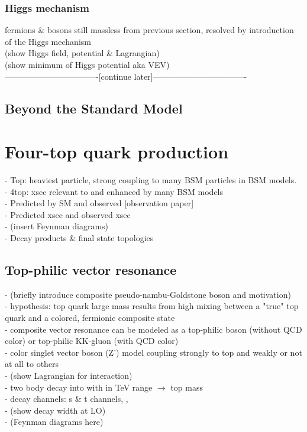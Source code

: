 \documentclass[../thesis.tex]{subfiles}
\begin{document}
\subsubsection*{Higgs mechanism}
fermions \& bosons still massless from previous section, resolved by introduction of the Higgs mechanism\\
(show Higgs field, potential \& Lagrangian)\\
(show minimum of Higgs potential aka VEV)\\
----------------------------------[continue later]----------------------------------

\subsection{Beyond the Standard Model}


\section{Four-top quark production}
\label{sec:4top}
- Top: heaviest particle, strong coupling to many BSM particles in BSM models.\\
- 4top: xsec relevant to and enhanced by many BSM models\\
- Predicted by SM and observed [observation paper]\\
- Predicted xsec and observed xsec\\
- (insert Feynman diagrams)\\
- Decay products \& final state topologies

\subsection*{Top-philic vector resonance}
- (briefly introduce composite pseudo-nambu-Goldstone boson and motivation)\\
- hypothesis: top quark large mass results from high mixing between a "true" top quark and a  colored, fermionic composite state\\
- composite vector resonance can be modeled as a top-philic \Zp boson (without QCD color) or top-philic KK-gluon (with QCD color)\\
- color singlet vector boson (Z') model coupling strongly to top and weakly or not at all to others\\
- (show Lagrangian for interaction)\\
- two body decay \Zp into \ttbar with \mZp in TeV range $\rightarrow$ top mass\\
- decay channels: \ttZp s \& t channels, \tWZp, \tjZp\\
- (show decay width at LO)\\
- (Feynman diagrams here)
\end{document}
